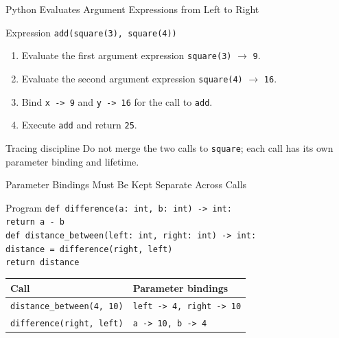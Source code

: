 \documentclass[aspectratio=169,10pt]{beamer}
\begin{document}
\begin{frame}{Python Evaluates Argument Expressions from Left to Right}
  \begin{block}{Expression}
    \centering
    \texttt{add(square(3), square(4))}
  \end{block}

  \begin{enumerate}
    \item Evaluate the first argument expression \texttt{square(3)} $\rightarrow$ \texttt{9}.
    \item Evaluate the second argument expression \texttt{square(4)} $\rightarrow$ \texttt{16}.
    \item Bind \texttt{x -> 9} and \texttt{y -> 16} for the call to \texttt{add}.
    \item Execute \texttt{add} and return \texttt{25}.
  \end{enumerate}

  \begin{alertblock}{Tracing discipline}
    Do not merge the two calls to \texttt{square}; each call has its own parameter binding and lifetime.
  \end{alertblock}
\end{frame}


\begin{frame}{Parameter Bindings Must Be Kept Separate Across Calls}
  \begin{block}{Program}
    \texttt{def difference(a: int, b: int) -> int:}\\
    \hspace*{0.20in}\texttt{return a - b}\\[0.06in]
    \texttt{def distance\_between(left: int, right: int) -> int:}\\
    \hspace*{0.20in}\texttt{distance = difference(right, left)}\\
    \hspace*{0.20in}\texttt{return distance}
  \end{block}

  \begin{center}
    \renewcommand{\arraystretch}{1.25}
    \begin{tabular}{l|l}
      \textbf{Call} & \textbf{Parameter bindings} \\\hline
      \texttt{distance\_between(4, 10)} & \texttt{left -> 4, right -> 10} \\
      \texttt{difference(right, left)} & \texttt{a -> 10, b -> 4}
    \end{tabular}
  \end{center}
\end{frame}
\end{document}
